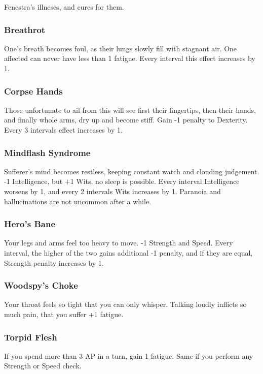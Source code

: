 \begin{multicols}{2}

Fenestra's illneses, and cures for them.

\subsubsection{Breathrot}

One's breath becomes foul, as their lungs slowly fill with stagnant air.
One affected can never have less than 1 \gls{fatigue}.
Every \gls{interval} this effect increases by 1.

\subsubsection{Corpse Hands}

Those unfortunate to ail from this will see first their fingertips, then their hands, and finally whole arms, dry up and become stiff.
Gain -1 penalty to Dexterity.
Every 3 \glspl{interval} effect increases by 1.

\subsubsection{Mindflash Syndrome}

Sufferer's mind becomes restless, keeping constant watch and clouding judgement.
-1 Intelligence, but +1 Wits, no sleep is possible.
Every \gls{interval} Intelligence worsens by 1, and every 2 \glspl{interval} Wits increases by 1.
Paranoia and hallucinations are not uncommon after a while.

\subsubsection{Hero's Bane}

Your legs and arms feel too heavy to move.
-1 Strength and Speed.
Every \gls{interval}, the higher of the two gains additional -1 penalty, and if they are equal, Strength penalty increases by 1.

\subsubsection{Woodspy's Choke}

Your throat feels so tight that you can only whisper. Talking loudly inflicts so much pain, that you suffer +1 \gls{fatigue}.

\subsubsection{Torpid Flesh}

If you spend more than 3 AP in a turn, gain 1 \gls{fatigue}.
Same if you perform any Strength or Speed check.

\end{multicols}


